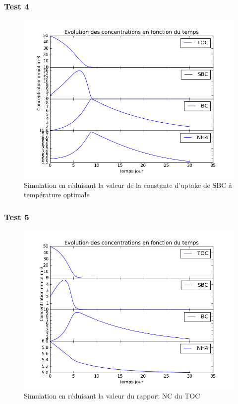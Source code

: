 \subsubsection{Test 4}

\begin{figure}[h!]
  \includegraphics[width=\textwidth]{partie1/Test4.png}
  \caption{Simulation en r\'eduisant la valeur de la constante d'uptake de SBC \`a temp\'erature optimale
  }
  \label{fig:partie1test4}
\end{figure}

\subsubsection{Test 5}

\begin{figure}[h!]
  \includegraphics[width=\textwidth]{partie1/Test5.png}
  \caption{Simulation en r\'eduisant la valeur du rapport NC du TOC
  }
  \label{fig:partie1test5}
\end{figure}

